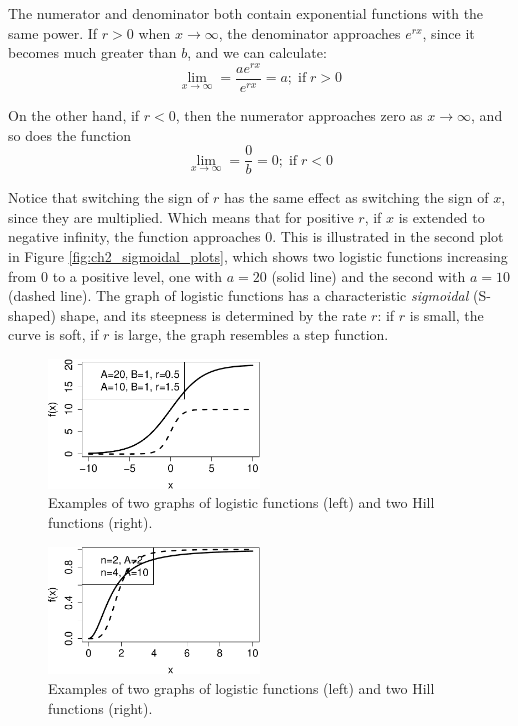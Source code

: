 \documentclass[
  letterpaper,
  DIV=11,
  numbers=noendperiod]{scrreprt}
\begin{document}
The numerator and denominator both contain exponential functions with
the same power. If \(r>0\) when \(x \to \infty\), the denominator
approaches \(e^{rx}\), since it becomes much greater than \(b\), and we
can calculate:
\[  \lim_{x \to \infty}  =  \frac{a e^{rx} }{e^{rx}} = a; \; \mathrm{if} \; r>0 \]

On the other hand, if \(r<0\), then the numerator approaches zero as
\(x \to \infty\), and so does the function
\[  \lim_{x \to \infty}  =  \frac{0}{b} = 0; \; \mathrm{if} \; r<0 \]

Notice that switching the sign of \(r\) has the same effect as switching
the sign of \(x\), since they are multiplied. Which means that for
positive \(r\), if \(x\) is extended to negative infinity, the function
approaches 0. This is illustrated in the second plot in Figure
\ref{fig:ch2_sigmoidal_plots}, which shows two logistic functions
increasing from 0 to a positive level, one with \(a=20\) (solid line)
and the second with \(a=10\) (dashed line). The graph of logistic
functions has a characteristic \emph{sigmoidal} (S-shaped) shape, and
its steepness is determined by the rate \(r\): if \(r\) is small, the
curve is soft, if \(r\) is large, the graph resembles a step function.

\begin{figure}

{\centering \includegraphics[width=0.5\textwidth,height=\textheight]{./functions_files/figure-pdf/ch2-funk2-1.pdf}

}

\caption{Examples of two graphs of logistic functions (left) and two
Hill functions (right).}

\end{figure}

\begin{figure}

{\centering \includegraphics[width=0.5\textwidth,height=\textheight]{./functions_files/figure-pdf/ch2-funk2-2.pdf}

}

\caption{Examples of two graphs of logistic functions (left) and two
Hill functions (right).}

\end{figure}
\end{document}
